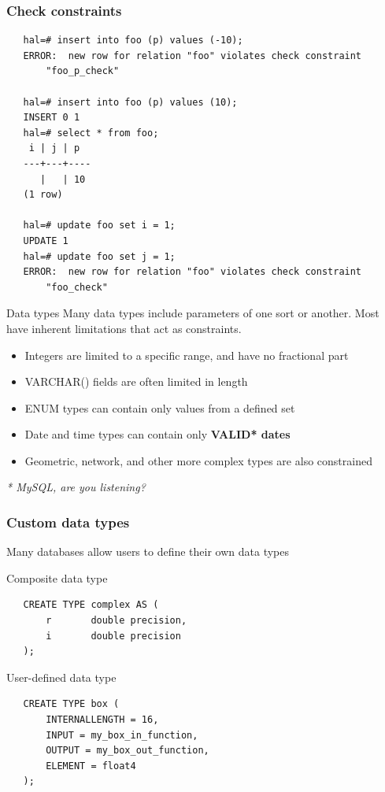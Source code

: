 \documentclass{beamer}
\begin{document}
\begin{frame}[fragile]
    \frametitle{Check constraints}
    \small
    \begin{verbatim}
   hal=# insert into foo (p) values (-10);
   ERROR:  new row for relation "foo" violates check constraint
       "foo_p_check"
   
   hal=# insert into foo (p) values (10);
   INSERT 0 1
   hal=# select * from foo;
    i | j | p
   ---+---+----
      |   | 10
   (1 row)
   
   hal=# update foo set i = 1;
   UPDATE 1
   hal=# update foo set j = 1;
   ERROR:  new row for relation "foo" violates check constraint
       "foo_check"
    \end{verbatim}
\end{frame}

\begin{frame}{Data types}
    Many data types include parameters of one sort or another. Most have
    inherent limitations that act as constraints.
    \begin{itemize}
        \item Integers are limited to a specific range, and have no fractional part
        \item VARCHAR() fields are often limited in length
        \item ENUM types can contain only values from a defined set
        \item Date and time types can contain only \bf{\color{red}VALID*} dates
        \item Geometric, network, and other more complex types are also constrained
    \end{itemize}
    \vspace{10mm}
    {\footnotesize \color{red} \emph{* MySQL, are you listening?}}
\end{frame}

\begin{frame}[fragile]
    \frametitle{Custom data types}
    Many databases allow users to define their own data types
    \begin{block}{Composite data type}
    \begin{verbatim}
   CREATE TYPE complex AS (
       r       double precision,
       i       double precision
   );
    \end{verbatim}
    \end{block}
    \begin{block}{User-defined data type}
    \begin{verbatim}
   CREATE TYPE box (
       INTERNALLENGTH = 16,
       INPUT = my_box_in_function,
       OUTPUT = my_box_out_function,
       ELEMENT = float4
   );
    \end{verbatim}
    \end{block}
\end{frame}
\end{document}
